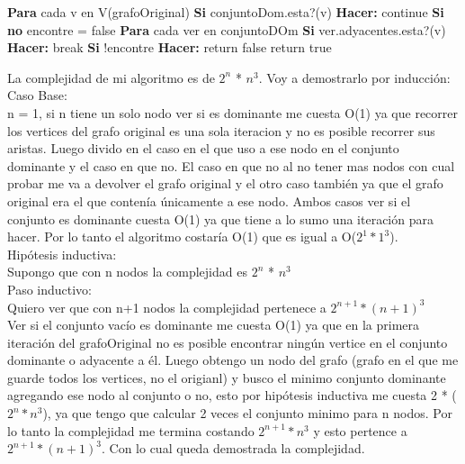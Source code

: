 \begin{codebox}
\li \textbf{Para} cada v en V(grafoOriginal) \Do
\li \textbf{Si} conjuntoDom.esta?(v) \textbf{Hacer:} \Do
\li			continue 
		\End
\li \textbf{Si no}  \Do
\li			encontre = false
\li \textbf{Para} cada ver en conjuntoDOm \Do
\li	\textbf{Si} ver.adyacentes.esta?(v) \textbf{Hacer:} \Do	
\li			break
			\End
\li	\textbf{Si} !encontre \textbf{Hacer:} \Do				
\li		return false
			\End
		\End
	\End
\End
	return true
\end{codebox}

La complejidad de mi algoritmo es de $2^n$ * $n^3$. Voy a demostrarlo por inducción:\\

Caso Base:\\

n = 1, si n tiene un solo nodo ver si es dominante me cuesta O(1) ya que recorrer los vertices del grafo original es una sola iteracion y no es posible recorrer sus aristas. Luego divido en el caso en el que uso a ese nodo en el conjunto dominante y el caso en que no. El caso en que no al no tener mas nodos con cual probar me va a devolver el grafo original y el otro caso también ya que el grafo original era el que contenía únicamente a ese nodo. Ambos casos ver si el conjunto es dominante cuesta O(1) ya que tiene a lo sumo una iteración para hacer. Por lo tanto el algoritmo costaría O(1) que es igual a O($2^1*1^3$).\\

Hipótesis inductiva:\\

Supongo que con n nodos la complejidad es $2^n$ * $n^3$\\

Paso inductivo:\\

Quiero ver que con n+1 nodos la complejidad pertenece a $2^{n+1}*(n+1)^3$\\

Ver si el conjunto vacío es dominante me cuesta O(1) ya que en la primera iteración del grafoOriginal no es posible encontrar ningún vertice en el conjunto dominante o adyacente a él. Luego obtengo un nodo del grafo (grafo en el que me guarde todos los vertices, no el origianl) y busco el minimo conjunto dominante agregando ese nodo al conjunto o no, esto por hipótesis inductiva me cuesta 2 * ($2^n * n^3$), ya que tengo que calcular 2 veces el conjunto minimo para n nodos. Por lo tanto la complejidad me termina costando  $2^{n+1}*n^3$ y esto pertence a $2^{n+1}*(n+1)^3$. Con lo cual queda demostrada la complejidad.\\

